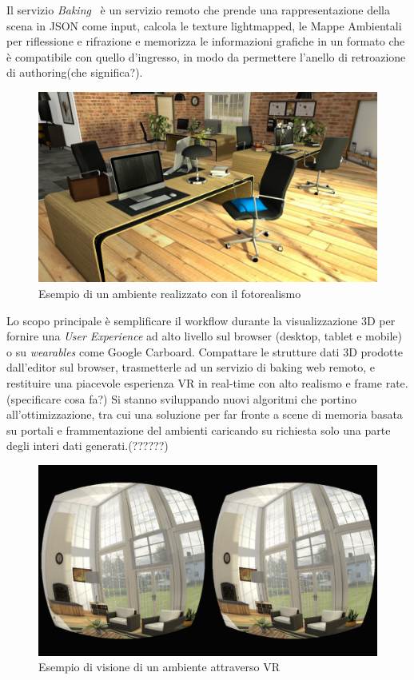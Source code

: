 Il servizio \emph{Baking}~\cite{baking} \`e un servizio remoto che prende una rappresentazione della scena in JSON come input,
calcola le texture lightmapped, le Mappe Ambientali per riflessione e rifrazione e memorizza le informazioni grafiche
in un formato che \`e compatibile con quello d'ingresso, in modo da permettere l'anello di retroazione di authoring(che significa?).\\

\begin{figure}[htbp] %
   \centering
   \includegraphics[width=1\linewidth]{images/explorer-a-1}
   \caption{Esempio di un ambiente realizzato con il fotorealismo}
   \label{fig:revit}
   \end{figure}

Lo scopo principale \`e semplificare il workflow durante la visualizzazione 3D per fornire una \emph{User Experience}
ad alto livello sul browser (desktop, tablet e mobile) o su \emph{wearables} come Google Carboard.
Compattare le strutture dati 3D prodotte dall'editor sul browser, trasmetterle ad un servizio di baking web remoto,
e restituire una piacevole esperienza VR in real-time con alto realismo e frame rate. (specificare cosa fa?)
Si stanno sviluppando nuovi algoritmi che portino all'ottimizzazione,
tra cui una soluzione per far fronte a scene di memoria basata su portali e frammentazione del ambienti caricando
su richiesta solo una parte degli interi dati generati.(??????)

\begin{figure}[htbp] %
   \centering
   \includegraphics[width=1\linewidth]{images/vr}
   \caption{Esempio di visione di un ambiente attraverso VR}
   \label{fig:revit}
   \end{figure}

